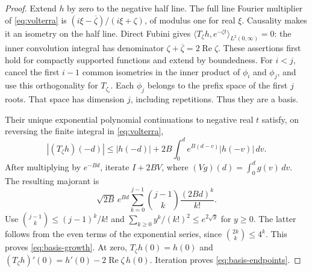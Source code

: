 \documentclass[11pt]{article}
\theoremstyle{remark}
\newcommand{\ip}[2]{\langle #1,#2\rangle}
\newcommand{\Rea}{\operatorname{Re}}
\begin{document}
\begin{proof}
Extend $h$ by zero to the negative half line. The full line Fourier
multiplier of \eqref{eq:volterra} is
$(i\xi-\overline\zeta)/(i\xi+\zeta)$, of modulus one for real $\xi$.
Causality makes it an isometry on the half line.
Direct Fubini gives
$\ip{T_\zeta h}{e^{-\zeta t}}_{L^2(0,\infty)}=0$:
the inner convolution integral has denominator
$\zeta+\overline\zeta=2\Rea\zeta$.
These assertions first hold for compactly supported functions and extend
by boundedness.
For $i<j$, cancel the first $i-1$ common isometries in the inner product
of $\phi_i$ and $\phi_j$, and use this orthogonality for $T_{\zeta_i}$.
Each $\phi_j$ belongs to the prefix space of the first $j$ roots.
That space has dimension $j$, including repetitions. Thus they are a basis.

Their unique exponential polynomial continuations to negative real $t$
satisfy, on reversing the finite integral in \eqref{eq:volterra},
\[
 |(T_\zeta h)(-d)|\le |h(-d)|+
       2B\int_0^d e^{B(d-v)}|h(-v)|\,dv.
\]
After multiplying by $e^{-Bd}$, iterate $I+2BV$, where
$(Vg)(d)=\int_0^d g(v)\,dv$. The resulting majorant is
\[
 \sqrt{2B}\,e^{Bd}\sum_{k=0}^{j-1}
          \binom{j-1}{k}\frac{(2Bd)^k}{k!}.
\]
Use $\binom{j-1}{k}\le(j-1)^k/k!$ and
$\sum_{k\ge0}y^k/(k!)^2\le e^{2\sqrt y}$ for $y\ge0$.
The latter follows from the even terms of the exponential series, since
$\binom{2k}{k}\le4^k$. This proves \eqref{eq:basis-growth}.
At zero, $T_\zeta h(0)=h(0)$ and
$(T_\zeta h)'(0)=h'(0)-2\Rea\zeta\,h(0)$.
Iteration proves \eqref{eq:basis-endpoints}.
\end{proof}
\end{document}
